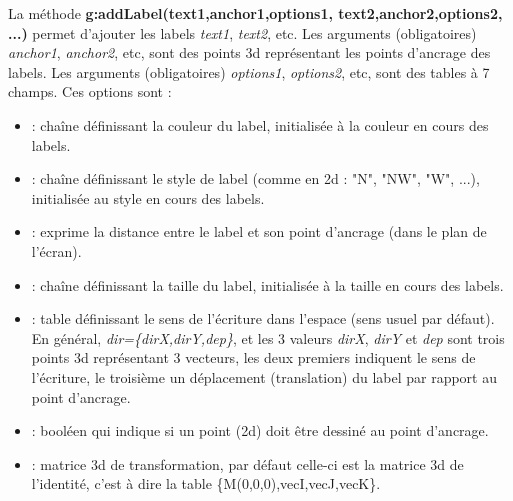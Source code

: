 \documentclass[%
10pt,%
a4paper,%
french,%
]%
{article}%
\begin{document}
La méthode \textbf{g:addLabel(text1,anchor1,options1, text2,anchor2,options2, ...)} permet d'ajouter les labels \emph{text1}, \emph{text2}, etc. Les arguments (obligatoires) \emph{anchor1}, \emph{anchor2}, etc, sont des points 3d représentant les points d'ancrage des labels. Les arguments (obligatoires) \emph{options1}, \emph{options2}, etc, sont des tables à 7 champs. Ces options sont :
\begin{itemize}
    \item {} : chaîne définissant la couleur du label, initialisée à la couleur en cours des labels.
    \item {} : chaîne définissant le style de label (comme en 2d : "N", "NW", "W", ...),  initialisée au style en cours des labels.
    \item {} : exprime la distance entre le label et son point d'ancrage (dans le plan de l'écran).
    \item {} : chaîne définissant la taille du label,  initialisée à la taille en cours des labels.
    \item {} : table définissant le sens de l'écriture dans l'espace (sens usuel par défaut).
    En général, \emph{dir=\{dirX,dirY,dep\}}, et les 3 valeurs \emph{dirX}, \emph{dirY} et \emph{dep} sont trois points 3d représentant 3 vecteurs, les deux premiers indiquent le sens de l'écriture, le troisième un déplacement (translation) du label par rapport au point d'ancrage.
    \item {} : booléen qui indique si un point (2d) doit être dessiné au point d'ancrage.
    \item {} : matrice 3d de transformation, par défaut celle-ci est la matrice 3d de l'identité, c'est à dire la table \{M(0,0,0),vecI,vecJ,vecK\}.
\end{itemize}
\end{document}
